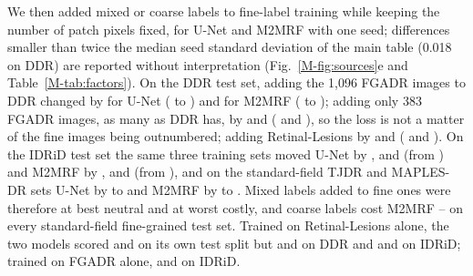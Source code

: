 We then added mixed or coarse labels to fine-label training while keeping the number of patch pixels fixed, for U-Net and M2MRF with one seed; differences smaller than twice the median seed standard deviation of the main table (0.018 on DDR) are reported without interpretation (Fig.~\ref{M-fig:sources}e and Table~\ref{M-tab:factors}). On the DDR test set, adding the 1,096 FGADR images to DDR changed \mAUPR{} by  for U-Net ( to ) and  for M2MRF ( to ); adding only 383 FGADR images, as many as DDR has, by  and  ( and ), so the loss is not a matter of the fine images being outnumbered; adding Retinal-Lesions by  and  ( and ). On the IDRiD test set the same three training sets moved U-Net by ,  and  (from ) and M2MRF by ,  and  (from ), and on the standard-field TJDR and MAPLES-DR sets U-Net by  to  and M2MRF by  to . Mixed labels added to fine ones were therefore at best neutral and at worst costly, and coarse labels cost M2MRF -- on every standard-field fine-grained test set. Trained on Retinal-Lesions alone, the two models scored  and  on its own test split but  and  on DDR and  and  on IDRiD; trained on FGADR alone,  and  on IDRiD.

